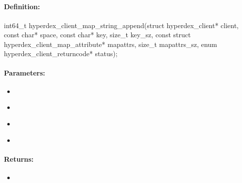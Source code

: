 \pagebreak
\subsection{}
\label{api:c:map_string_append}


\paragraph{Definition:}
\begin{ccode}
int64_t hyperdex_client_map_string_append(struct hyperdex_client* client,
        const char* space,
        const char* key, size_t key_sz,
        const struct hyperdex_client_map_attribute* mapattrs, size_t mapattrs_sz,
        enum hyperdex_client_returncode* status);
\end{ccode}

\paragraph{Parameters:}
\begin{itemize}[noitemsep]
\item {}\\

\item {}\\

\item {}\\

\item {}\\

\end{itemize}

\paragraph{Returns:}
\begin{itemize}[noitemsep]
\item {}\\

\end{itemize}

